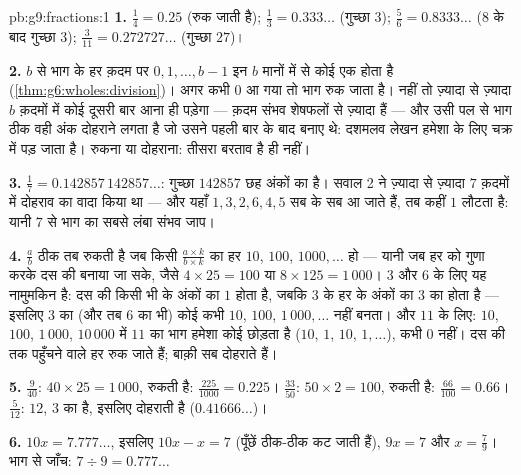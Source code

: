 \begin{solution}{pb:g9:fractions:1}
\textbf{1.} $\frac14 = 0.25$ (रुक जाती है);
$\frac13 = 0.333\ldots$ (गुच्छा $3$); $\frac56 = 0.8333\ldots$
($8$ के बाद गुच्छा $3$); $\frac{3}{11} = 0.272727\ldots$ (गुच्छा
$27$)।

\textbf{2.} $b$ से भाग के हर क़दम पर  $0, 1, \dots, b - 1$
इन $b$ मानों में से कोई एक होता है
(\cref{thm:g6:wholes:division})। अगर कभी  $0$ आ गया तो भाग
रुक जाता है। नहीं तो ज़्यादा से ज़्यादा $b$ क़दमों में कोई 
दूसरी बार आना ही पड़ेगा --- क़दम संभव शेषफलों से ज़्यादा हैं --- और
उसी पल से भाग ठीक वही अंक दोहराने लगता है जो उसने पहली बार के बाद
बनाए थे: दशमलव लेखन हमेशा के लिए चक्र में पड़ जाता है। रुकना या
दोहराना: तीसरा बरताव है ही नहीं।

\textbf{3.} $\frac17 = 0.142857\,142857\ldots$: गुच्छा $142857$
छह अंकों का है। सवाल 2 ने ज़्यादा से ज़्यादा $7$ क़दमों में दोहराव
का वादा किया था --- और यहाँ  $1, 3, 2, 6, 4, 5$ सब के सब आ
जाते हैं, तब कहीं $1$ लौटता है: यानी $7$ से भाग का सबसे लंबा संभव
जाप।

\textbf{4.} $\frac ab$ ठीक तब रुकती है जब किसी
$\frac{a \times k}{b \times k}$ का हर $10$, $100$,
$1000, \dots$ हो --- यानी जब हर को गुणा करके दस की  बनाया जा
सके, जैसे $4 \times 25 = 100$ या $8 \times 125 = 1\,000$। $3$ और
$6$ के लिए यह नामुमकिन है: दस की किसी भी  के अंकों का  $1$
होता है, जबकि $3$ के हर  के अंकों का  $3$ का  होता
है --- इसलिए $3$ का (और तब $6$ का भी) कोई  कभी $10$, $100$,
$1\,000, \dots$ नहीं बनता। और $11$ के लिए: $10$, $100$, $1\,000$,
$10\,000$ में $11$ का भाग हमेशा कोई  छोड़ता है ($10$, $1$,
$10$, $1, \dots$), कभी $0$ नहीं।
दस की  तक पहुँचने वाले हर रुक जाते हैं; बाक़ी सब दोहराते हैं।

\textbf{5.} $\frac{9}{40}$: $40 \times 25 = 1\,000$, रुकती है:
$\frac{225}{1000} = 0.225$। $\frac{33}{50}$:
$50 \times 2 = 100$, रुकती है: $\frac{66}{100} = 0.66$।
$\frac{5}{12}$: $12$, $3$ का  है, इसलिए दोहराती है
($0.41666\ldots$)।

\textbf{6.} $10x = 7.777\ldots$, इसलिए $10x - x = 7$ (पूँछें ठीक-ठीक
कट जाती हैं), $9x = 7$ और $x = \frac79$। भाग से जाँच:
$7 \div 9 = 0.777\ldots$


\end{solution}
